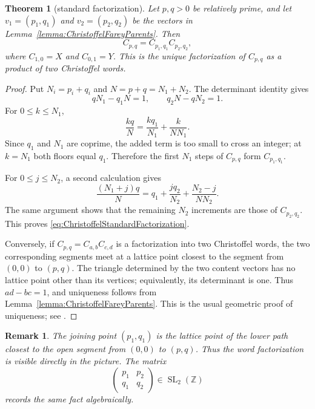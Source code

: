 \documentclass{book}
\newtheorem{remark}[definition]{Remark}
\newtheorem{theorem}[definition]{Theorem}
\begin{document}
\begin{theorem}[standard factorization]
  \label{theorem:ChristoffelStandardFactorization}
  Let \(p,q>0\) be relatively prime, and let \(v_1=(p_1,q_1)\) and
  \(v_2=(p_2,q_2)\) be the vectors in
  Lemma~\ref{lemma:ChristoffelFareyParents}.  Then
  \begin{equation}\label{eq:ChristoffelStandardFactorization}
    C_{p,q}=C_{p_1,q_1}C_{p_2,q_2},
  \end{equation}
  where \(C_{1,0}=X\) and \(C_{0,1}=Y\).  This is the unique
  factorization of \(C_{p,q}\) as a product of two Christoffel words.
\end{theorem}
\begin{proof}
  Put \(N_i=p_i+q_i\) and \(N=p+q=N_1+N_2\).  The determinant identity
  gives
  \[
    qN_1-q_1N=1,
    \qquad q_2N-qN_2=1.
  \]
  For \(0\leq k\leq N_1\),
  \[
    \frac{kq}{N}=\frac{kq_1}{N_1}+\frac{k}{NN_1}.
  \]
  Since \(q_1\) and \(N_1\) are coprime, the added term is too small to
  cross an integer; at \(k=N_1\) both floors equal \(q_1\).  Therefore
  the first \(N_1\) steps of \(C_{p,q}\) form \(C_{p_1,q_1}\).

  For \(0\leq j\leq N_2\), a second calculation gives
  \[
    \frac{(N_1+j)q}{N}
    =q_1+\frac{jq_2}{N_2}+\frac{N_2-j}{NN_2}.
  \]
  The same argument shows that the remaining \(N_2\) increments are those
  of \(C_{p_2,q_2}\).  This proves
  \eqref{eq:ChristoffelStandardFactorization}.

  Conversely, if \(C_{p,q}=C_{a,b}C_{c,d}\) is a factorization into two
  Christoffel words, the two corresponding segments meet at a lattice
  point closest to the segment from \((0,0)\) to \((p,q)\).  The triangle
  determined by the two content vectors has no lattice point other than
  its vertices; equivalently, its determinant is one.  Thus
  \(ad-bc=1\), and uniqueness follows from
  Lemma~\ref{lemma:ChristoffelFareyParents}.  This is the usual geometric
  proof of uniqueness; see
  \cite[Theorem~3.3]{BerstelLauveReutenauerSaliola2009}.
\end{proof}

\begin{remark}
  The joining point \((p_1,q_1)\) is the lattice point of the lower path
  closest to the open segment from \((0,0)\) to \((p,q)\).  Thus the word
  factorization is visible directly in the picture.  The matrix
  \[
    \begin{pmatrix}p_1&p_2\\q_1&q_2\end{pmatrix}
    \in\operatorname{SL}_2(\mathbb Z)
  \]
  records the same fact algebraically.
\end{remark}
\end{document}
